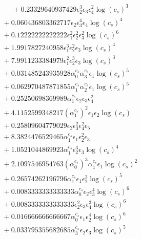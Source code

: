 \documentclass[10pt]{article}
\begin{document}
\begin{align*}
\phantom{F_{s,6}} &\phantom{={}}{}  + 0.23329640937429 \epsilon_{2}^{3} \epsilon_{3} \epsilon_{4}^{2} \log{\left(c_{s} \right)}^{3} \\
&{}  + 0.060436803362717 \epsilon_{2} \epsilon_{3}^{4} \epsilon_{4} \log{\left(c_{s} \right)}^{4} \\
&{}  + 0.12222222222222 \epsilon_{1}^{2} \epsilon_{2}^{2} \epsilon_{3}^{2} \log{\left(c_{s} \right)}^{6} \\
&{}  + 1.9917827240958 \epsilon_{1}^{3} \epsilon_{2}^{2} \epsilon_{3} \log{\left(c_{s} \right)}^{4} \\
&{}  + 7.9911233384979 \epsilon_{1}^{2} \epsilon_{2}^{3} \epsilon_{3} \log{\left(c_{s} \right)}^{3} \\
&{}  + 0.031485243935928 \alpha_{0}^{c_s} \alpha_{3}^{c_s} \epsilon_{1} \log{\left(c_{s} \right)}^{5} \\
&{}  + 0.062970487871855 \alpha_{1}^{c_s} \alpha_{2}^{c_s} \epsilon_{1} \log{\left(c_{s} \right)}^{5} \\
&{}  + 0.25250698369989 \alpha_{1}^{c_s} \epsilon_{2} \epsilon_{3} \epsilon_{4}^{2} \\
&{}  + 4.1152599348217 \left(\alpha_{1}^{c_s}\right)^{2} \epsilon_{1} \epsilon_{2} \log{\left(c_{s} \right)} \\
&{}  + 0.25809604779029 \epsilon_{2} \epsilon_{3}^{2} \epsilon_{4}^{2} \epsilon_{5} \\
&{}  + 8.3824476529465 \alpha_{1}^{c_s} \epsilon_{1} \epsilon_{2}^{2} \epsilon_{3} \\
&{}  + 1.0521044869923 \alpha_{1}^{c_s} \epsilon_{2}^{3} \epsilon_{3} \log{\left(c_{s} \right)}^{4} \\
&{}  + 2.1097546954763 \left(\alpha_{0}^{c_s}\right)^{3} \alpha_{1}^{c_s} \epsilon_{1} \log{\left(c_{s} \right)}^{2} \\
&{}  + 0.26574262196796 \alpha_{1}^{c_s} \epsilon_{1} \epsilon_{2}^{3} \log{\left(c_{s} \right)}^{5} \\
&{}  + 0.0083333333333333 \alpha_{0}^{c_s} \epsilon_{2} \epsilon_{3}^{4} \log{\left(c_{s} \right)}^{6} \\
&{}  + 0.0083333333333333 \epsilon_{2}^{2} \epsilon_{3} \epsilon_{4}^{3} \log{\left(c_{s} \right)}^{6} \\
&{}  + 0.016666666666667 \alpha_{0}^{c_s} \epsilon_{1} \epsilon_{2}^{4} \log{\left(c_{s} \right)}^{6} \\
&{}  + 0.033795355682685 \alpha_{3}^{c_s} \epsilon_{2} \epsilon_{3} \log{\left(c_{s} \right)}^{5} \\

\end{align*}
\end{document}
